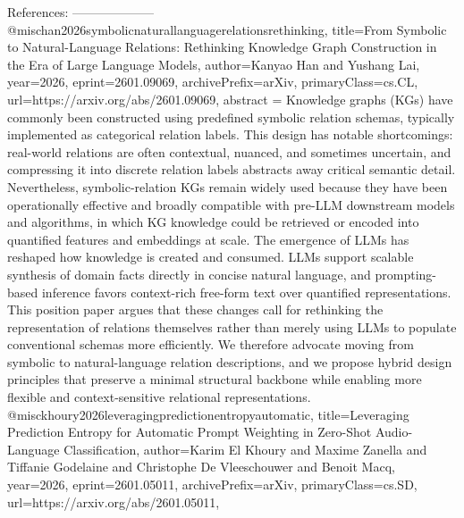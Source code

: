         References:
        --------------------
        @misc{han2026symbolicnaturallanguagerelationsrethinking,
      title={From Symbolic to Natural-Language Relations: Rethinking Knowledge Graph Construction in the Era of Large Language Models}, 
      author={Kanyao Han and Yushang Lai},
      year={2026},
      eprint={2601.09069},
      archivePrefix={arXiv},
      primaryClass={cs.CL},
      url={https://arxiv.org/abs/2601.09069},
      abstract = {Knowledge graphs (KGs) have commonly been constructed using predefined symbolic relation schemas, typically implemented as categorical relation labels. This design has notable shortcomings: real-world relations are often contextual, nuanced, and sometimes uncertain, and compressing it into discrete relation labels abstracts away critical semantic detail. Nevertheless, symbolic-relation KGs remain widely used because they have been operationally effective and broadly compatible with pre-LLM downstream models and algorithms, in which KG knowledge could be retrieved or encoded into quantified features and embeddings at scale. The emergence of LLMs has reshaped how knowledge is created and consumed. LLMs support scalable synthesis of domain facts directly in concise natural language, and prompting-based inference favors context-rich free-form text over quantified representations. This position paper argues that these changes call for rethinking the representation of relations themselves rather than merely using LLMs to populate conventional schemas more efficiently. We therefore advocate moving from symbolic to natural-language relation descriptions, and we propose hybrid design principles that preserve a minimal structural backbone while enabling more flexible and context-sensitive relational representations.}
}@misc{khoury2026leveragingpredictionentropyautomatic,
      title={Leveraging Prediction Entropy for Automatic Prompt Weighting in Zero-Shot Audio-Language Classification}, 
      author={Karim El Khoury and Maxime Zanella and Tiffanie Godelaine and Christophe De Vleeschouwer and Benoit Macq},
      year={2026},
      eprint={2601.05011},
      archivePrefix={arXiv},
      primaryClass={cs.SD},
      url={https://arxiv.org/abs/2601.05011},
}
